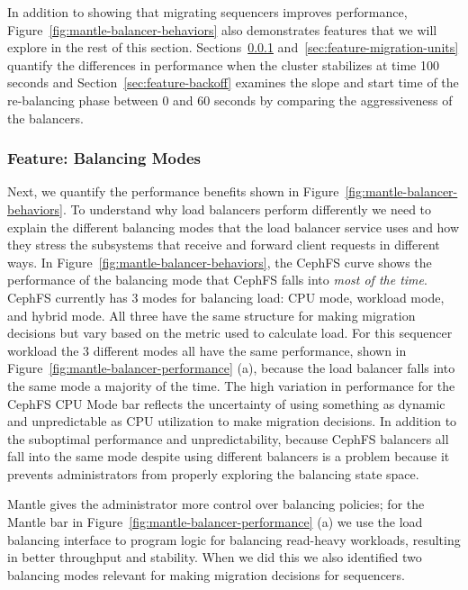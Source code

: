 In addition to showing that migrating sequencers improves performance,
Figure~\ref{fig:mantle-balancer-behaviors} also demonstrates features that we
will explore in the rest of this section.
Sections~\ref{sec:feature-balancing-modes}
and~\ref{sec:feature-migration-units} quantify the differences in performance
when the cluster stabilizes at time 100 seconds and
Section~\ref{sec:feature-backoff} examines the slope and start time of the
re-balancing phase between 0 and 60 seconds by comparing the aggressiveness of
the balancers.

\subsubsection{Feature: Balancing Modes}
\label{sec:feature-balancing-modes}

Next, we quantify the performance benefits shown in
Figure~\ref{fig:mantle-balancer-behaviors}.  To understand why load balancers
perform differently we need to explain the different balancing modes that the
load balancer service uses and how they stress the subsystems that receive and
forward client requests in different ways. In
Figure~\ref{fig:mantle-balancer-behaviors}, the CephFS curve shows the
performance of the balancing mode that CephFS falls into {\it most of the
time}.  CephFS currently has 3 modes for balancing load: CPU mode, workload mode, and
hybrid mode. All three have the same structure for making migration decisions
but vary based on the metric used to calculate load. For this sequencer
workload the 3 different modes all have the same performance, shown in
Figure~\ref{fig:mantle-balancer-performance} (a), because the load balancer
falls into the same mode a majority of the time.  The high variation in
performance for the CephFS CPU Mode bar reflects the uncertainty of using
something as dynamic and unpredictable as CPU utilization to make migration
decisions. In addition to the suboptimal performance and unpredictability,
because CephFS balancers all fall into the same mode despite using different
balancers is a problem because it prevents administrators from properly
exploring the balancing state space.

Mantle gives the administrator more control over balancing policies; for the
Mantle bar in Figure~\ref{fig:mantle-balancer-performance} (a) we use the load
balancing interface to program logic for balancing read-heavy workloads,
resulting in better throughput and stability.  When we did this we also
identified two balancing modes relevant for making migration decisions for
sequencers. 

